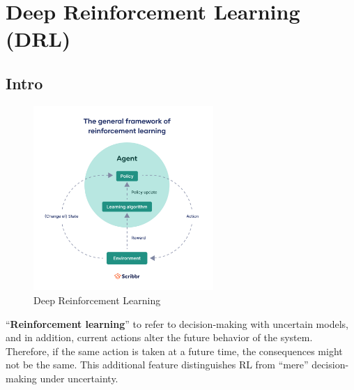 \chapter{Deep Reinforcement Learning (DRL)}\label{Deep Reinforcement Learning (DRL)}

\section*{Intro \cite{drl-1}}

\begin{table}[H]
    \begin{minipage}{0.45\linewidth}
        \begin{figure}[H]
            \centering
            \includegraphics[height=7cm]{Pictures/deep-reinforcement-learning/drl-flow.jpg}
            \caption{Deep Reinforcement Learning}
        \end{figure}        
    \end{minipage}
    \hfill
    \begin{minipage}{0.45\linewidth}
        “\textbf{Reinforcement learning}” to refer to decision-making with uncertain models, and in addition, current actions alter the future behavior of the system. Therefore, if the same action is taken at a future time, the consequences might not be the same. This additional feature distinguishes RL from “mere” decision-making under uncertainty.\cite{arxiv-2304.00803}
    \end{minipage}
\end{table}





